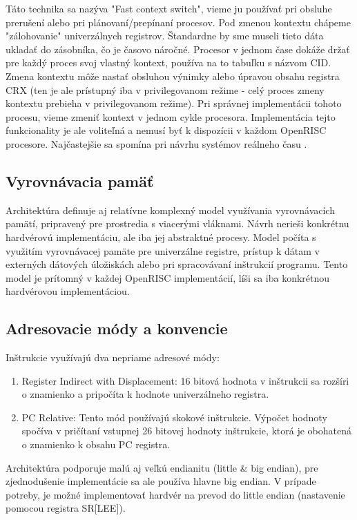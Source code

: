 \documentclass[conference]{IEEEtran}
\begin{document}
Táto technika sa nazýva "Fast context switch", vieme ju používať pri obsluhe prerušení alebo pri  plánovaní/prepínaní procesov. Pod zmenou kontextu chápeme "zálohovanie" univerzálnych registrov. Štandardne by sme museli tieto dáta ukladať do zásobníka, čo je časovo náročné.  Procesor v jednom čase dokáže držať pre každý proces svoj vlastný kontext, používa na to tabuľku s názvom CID. Zmena kontextu môže nastať obsluhou výnimky alebo úpravou obsahu registra CRX (ten je ale prístupný iba v privilegovanom režime - celý proces zmeny kontextu prebieha v privilegovanom režime). Pri správnej implementácii tohoto procesu, vieme zmeniť kontext v jednom cykle procesora. Implementácia tejto funkcionality je ale voliteľná a nemusí byť k dispozícii v každom OpenRISC procesore. Najčastejšie sa spomína pri návrhu systémov reálneho času \cite{Snyder1995FastCS}.

\subsection{Vyrovnávacia pamäť}

Architektúra definuje aj relatívne komplexný model využívania vyrovnávacích pamätí, pripravený pre   prostredia s viacerými vláknami. Návrh nerieši konkrétnu hardvérovú implementáciu, ale iba jej abstraktné procesy. Model počíta s využitím vyrovnávacej pamäte pre univerzálne registre, prístup k dátam v externých dátových úložiskách alebo pri spracovávaní inštrukcií programu. Tento model je prítomný v každej OpenRISC implementácií, líši sa iba konkrétnou hardvérovou implementáciou.

\subsection{Adresovacie módy a konvencie}

Inštrukcie využívajú dva nepriame adresové módy:

\begin{enumerate}
  \item Register Indirect with Displacement: 16 bitová hodnota v inštrukcii sa rozšíri o znamienko a pripočíta k hodnote univerzálneho registra.
  \item PC Relative: Tento mód používajú skokové inštrukcie. Výpočet hodnoty spočíva v pričítaní vstupnej 26 bitovej hodnoty inštrukcie, ktorá je obohatená o znamienko k obsahu PC registra.
\end{enumerate}

Architektúra podporuje malú aj veľkú endianitu (little \& big endian), pre zjednodušenie implementácie sa ale používa hlavne big endian. V prípade potreby, je možné implementovať  hardvér na prevod do little endian (nastavenie pomocou registra SR[LEE]).
\end{document}
